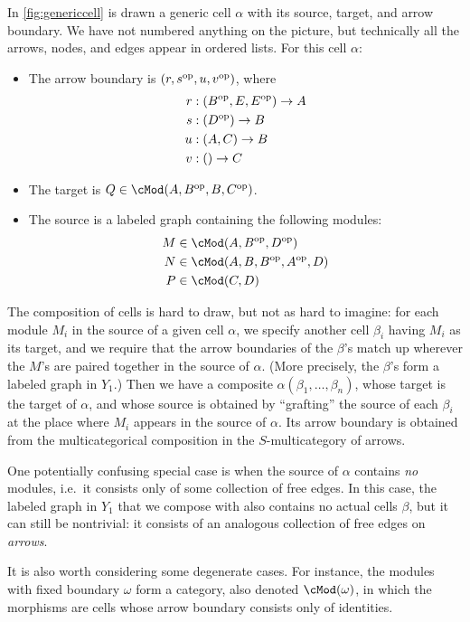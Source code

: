 \documentclass{amsart}
\begin{document}
In \cref{fig:genericcell} is drawn a generic cell $\alpha$ with its source, target, and arrow boundary.
We have not numbered anything on the picture, but technically all the arrows, nodes, and edges appear in ordered lists.
For this cell $\alpha$:
\begin{itemize}
\item The arrow boundary is $(r,s^{\mathrm{op}},u,v^{\mathrm{op}})$, where
  \begin{align*}
    r &: (B^{\mathrm{op}},E,E^{\mathrm{op}}) \to A\\
    s &: (D^{\mathrm{op}}) \to B\\
    u &: (A,C) \to B\\
    v &: () \to C
  \end{align*}
\item The target is $Q\in\cMod(A,B\op,B,C\op)$.
\item The source is a labeled graph containing the following modules:
  \begin{align*}
    M &\in \cMod(A,B\op,D\op)\\
    N &\in \cMod(A,B,B\op,A\op,D)\\
    P &\in \cMod(C,D)
  \end{align*}
\end{itemize}
The composition of cells is hard to draw, but not as hard to imagine: for each module $M_i$ in the source of a given cell $\alpha$, we specify another cell $\beta_i$ having $M_i$ as its target, and we require that the arrow boundaries of the $\beta$'s match up wherever the $M$'s are paired together in the source of $\alpha$.
(More precisely, the $\beta$'s form a labeled graph in $Y_1$.)
Then we have a composite $\alpha(\beta_1,\dots,\beta_n)$, whose target is the target of $\alpha$, and whose source is obtained by ``grafting'' the source of each $\beta_i$ at the place where $M_i$ appears in the source of $\alpha$.
Its arrow boundary is obtained from the multicategorical composition in the $S$-multicategory of arrows.

One potentially confusing special case is when the source of $\alpha$ contains \emph{no} modules, i.e.\ it consists only of some collection of free edges.
In this case, the labeled graph in $Y_1$ that we compose with also contains no actual cells $\beta$, but it can still be nontrivial: it consists of an analogous collection of free edges on \emph{arrows}.

It is also worth considering some degenerate cases.
For instance, the modules with fixed boundary $\omega$ form a category, also denoted $\cMod(\omega)$, in which the morphisms are cells whose arrow boundary consists only of identities.
\end{document}

